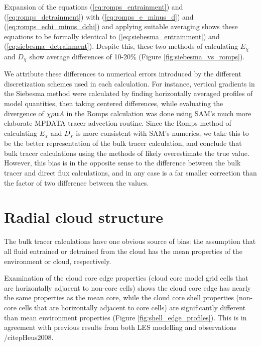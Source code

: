 \documentclass[draft,grl]{agutex}
\begin{document}
\begin{article}
Expansion of the equations (\ref{eq:romps_entrainment}) and 
(\ref{eq:romps_detrainment}) with (\ref{eq:romps_e_minus_d}) and 
(\ref{eq:romps_echi_minus_dchi}) and applying suitable averaging shows these 
equations to be formally identical to (\ref{eq:siebesma_entrainment}) and 
(\ref{eq:siebesma_detrainment}).  Despite this, these two methods of 
calculating $E_{\chi}$ and $D_{\chi}$ show average differences of 10-20\% 
(Figure \ref{fig:siebesma_vs_romps}).

We attribute these differences to numerical errors introduced by the 
different discretization schemes used in each calculation.  For instance, 
vertical gradients in the Siebesma method were calculated by finding 
horizontally averaged profiles of model quantities, then taking centered 
differences, while evaluating the divergence of $\chi \rho \mathbf{u} A$ in 
the Romps calculation was done using SAM's much more elaborate MPDATA tracer 
advection routine.  Since the Romps method of calculating $E_{\chi}$ and 
$D_{\chi}$ is more consistent with SAM's numerics, we take this to be the 
better representation of the bulk tracer calculation, and conclude that 
bulk tracer calculations using the methods of \cite{Siebesma1995} likely 
overestimate the true value.  However, this bias is in the opposite sense to 
the difference between the bulk tracer and direct flux calculations, and in 
any case is a far smaller correction than the factor of two difference between
the values.


\section{Radial cloud structure}

The bulk tracer calculations have one obvious source of bias: the assumption 
that all fluid entrained or detrained from the cloud has the mean properties of 
the environment or cloud, respectively.  

Examination of the cloud core edge properties (cloud core model grid cells 
that are horizontally adjacent to non-core cells) shows the cloud core edge has 
nearly the same properties as the mean core, while the cloud core shell 
properties (non-core cells that are horizontally adjacent to core cells) 
are significantly different than mean environment properties (Figure 
\ref{fig:shell_edge_profiles}).  This is in agreement with previous results 
from both LES modelling and observations /citep{Heus2008}.




\end{article}
\end{document}
